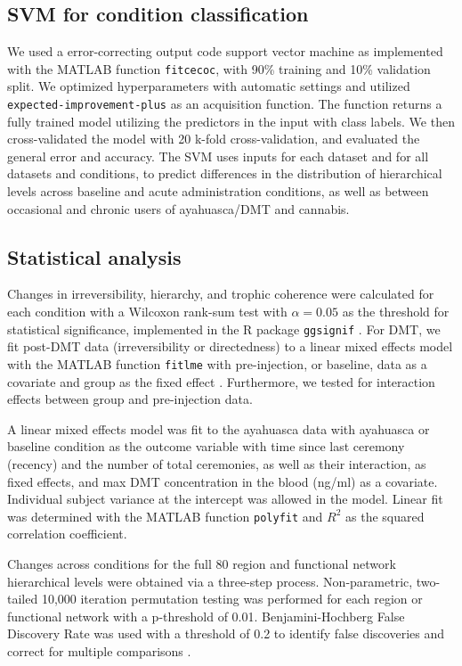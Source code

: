 \subsection{SVM for condition classification} 
We used a error-correcting output code support vector machine
as implemented with the MATLAB function \texttt{fitcecoc}, with 90\%
training and 10\% validation split. We optimized hyperparameters with
automatic settings and utilized \texttt{expected-improvement-plus} as an
acquisition function. The function returns a fully trained model
utilizing the predictors in the input with class labels. We then
cross-validated the model with 20 k-fold cross-validation, and evaluated
the general error and accuracy. The SVM uses inputs for each dataset and
for all datasets and conditions, to predict differences in the
distribution of hierarchical levels across baseline and acute
administration conditions, as well as between occasional and chronic
users of ayahuasca/DMT and cannabis. 
\subsection{Statistical analysis}
Changes
in irreversibility, hierarchy, and trophic coherence were calculated for
each condition with a Wilcoxon rank-sum test with \(\alpha = 0.05\) as
the threshold for statistical significance, implemented in the R package
\texttt{ggsignif} \parencite{ggsignif, Tidyverse, Package}. For DMT, we fit post-DMT data (irreversibility or
directedness) to a linear mixed effects model with the MATLAB function
\texttt{fitlme} with pre-injection, or baseline, data as a covariate and
group as the fixed effect \parencite{MATLAB}. Furthermore, we tested for interaction
effects between group and pre-injection data.

A linear mixed effects model was fit to the ayahuasca data with
ayahuasca or baseline condition as the outcome variable with time since
last ceremony (recency) and the number of total ceremonies, as well as
their interaction, as fixed effects, and max DMT concentration in the
blood (ng/ml) as a covariate. Individual subject variance at the
intercept was allowed in the model. Linear fit was determined with the
MATLAB function \texttt{polyfit} and \(R^2\) as the squared correlation
coefficient.

Changes across conditions for the full 80 region and functional network
hierarchical levels were obtained via a three-step process.
Non-parametric, two-tailed 10,000 iteration permutation testing was
performed for each region or functional network with a p-threshold of
0.01. Benjamini-Hochberg False Discovery Rate was used with a threshold
of 0.2 to identify false discoveries and correct for multiple
comparisons \parencite{Benjamini1995}. 